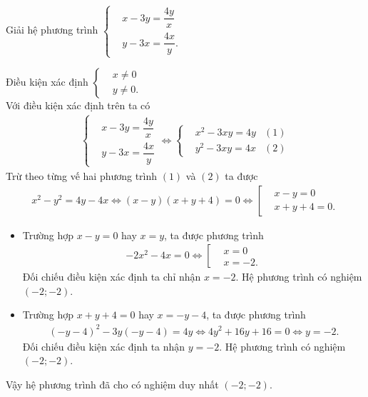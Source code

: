 \begin{bt}%
 Giải hệ phương trình $\left\{\begin{aligned}&x-3y=\dfrac{4y}{x} \\&y-3x=\dfrac{4x}{y}.\end{aligned}\right.$
 \loigiai
  {
  Điều kiện xác định $\left\{\begin{aligned}&x\neq 0 \\&y\neq 0.\end{aligned}\right.$\\
  Với điều kiện xác định trên ta có
  \begin{eqnarray*}
   \left\{\begin{aligned}&x-3y=\dfrac{4y}{x} \\&y-3x=\dfrac{4x}{y}\end{aligned}\right. \Leftrightarrow \left\{\begin{aligned}&x^2-3xy=4y &(1)\\&y^2-3xy=4x &(2)\end{aligned}\right.
  \end{eqnarray*}
  Trừ theo từng vế hai phương trình $(1)$ và $(2)$ ta được
  \begin{eqnarray*}
   x^2-y^2=4y-4x \Leftrightarrow (x-y)(x+y+4)=0 \Leftrightarrow \left[\begin{aligned}&x-y=0 \\&x+y+4=0.\end{aligned}\right.
  \end{eqnarray*}
  \begin{itemize}
   \item Trường hợp $x-y=0$ hay $x=y$, ta được phương trình
   \begin{eqnarray*}
    -2x^2-4x=0 \Leftrightarrow \left[\begin{aligned}&x=0 \\&x=-2.\end{aligned}\right.
   \end{eqnarray*}
   Đối chiếu điều kiện xác định ta chỉ nhận $x=-2$. Hệ phương trình có nghiệm $(-2;-2)$.
   \item Trường hợp $x+y+4=0$ hay $x=-y-4$, ta được phương trình
   \begin{eqnarray*}
    (-y-4)^2-3y(-y-4)=4y \Leftrightarrow 4y^2+16y+16=0 \Leftrightarrow y=-2.
   \end{eqnarray*}
   Đối chiếu điều kiện xác định ta nhận $y=-2$. Hệ phương trình có nghiệm $(-2;-2)$.
  \end{itemize}
  Vậy hệ phương trình đã cho có nghiệm duy nhất $(-2;-2)$.
  }
\end{bt}

